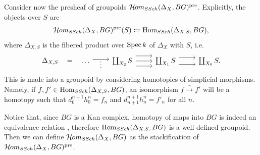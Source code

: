 Consider now the presheaf of groupoids $\mathcal{H}\kern -.5pt om_{SSch}(\Delta_X, BG)^{\text{pre}}$. Explicitly, the objects over $S$ are
\begin{equation}
\mathcal{H}\kern -.5pt om_{SSch}(\Delta_X, BG)^{\text{pre}}(S) \coloneqq \operatorname{Hom}_{SSch}(\Delta_{X, S}, BG),
\end{equation}
where $\Delta_{X,S}$ is the fibered product over $\operatorname{Spec} k$ of $\Delta_X$ with $S$, i.e.
\begin{equation}
\begin{tikzcd}
	{\Delta_{X,S}} & \dots & {\coprod_{X_2} S} & {\coprod_{X_1} S} & {\coprod_{X_0} S.}
	\arrow["{=}"{marking, allow upside down}, draw=none, from=1-1, to=1-2]
	\arrow["\vdots"'{yshift=5pt}, shift left, from=1-2, to=1-3]
	\arrow[from=1-3, to=1-4]
	\arrow[shift left=3, from=1-3, to=1-4]
	\arrow[shift right=3, from=1-3, to=1-4]
	\arrow[shift right=2, from=1-4, to=1-5]
	\arrow[shift left=2, from=1-4, to=1-5]
\end{tikzcd}
\end{equation}
This is made into a groupoid by considering homotopies of simplicial morphisms. Namely, if $f,f' \in \operatorname{Hom}_{SSch}(\Delta_{X, S}, BG)$, an isomorphism $f \xrightarrow{\sim} f'$ will be a homotopy such that $d_0^{n+1} h_0^n = f_n$ and $d_{n+1}^{n+1} h_n^n = f'_n$ for all $n$.

Notice that, since $BG$ is a Kan complex, homotopy of maps into $BG$ is indeed an equivalence relation \cite[Corollary I.6.2]{SimplicialHomotopyTheory}, therefore $\operatorname{Hom}_{SSch}(\Delta_{X, S}, BG)$ is a well defined groupoid. Then we can define $\mathcal{H}\kern -.5pt om_{SSch}(\Delta_X, BG)$ as the stackification of $\mathcal{H}\kern -.5pt om_{SSch}(\Delta_X, BG)^{\text{pre}}$.

